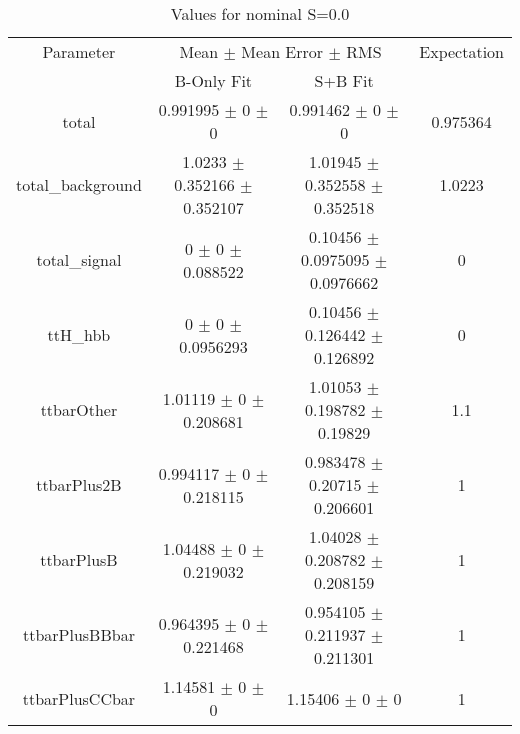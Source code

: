 \begin{table}
\centering
\caption{Values for nominal S=0.0}
\begin{tabular}{cccc}
\toprule
Parameter & \multicolumn{2}{c}{Mean $\pm$ Mean Error $\pm$ RMS} & Expectation\\
 & B-Only Fit & S+B Fit & \\
\midrule
total & \num{0.991995} $\pm$ \num{0} $\pm$ \num{0} & \num{0.991462} $\pm$ \num{0} $\pm$ \num{0} & \num{0.975364}\\
total\_background & \num{1.0233} $\pm$ \num{0.352166} $\pm$ \num{0.352107} & \num{1.01945} $\pm$ \num{0.352558} $\pm$ \num{0.352518} & \num{1.0223}\\
total\_signal & \num{0} $\pm$ \num{0} $\pm$ \num{0.088522} & \num{0.10456} $\pm$ \num{0.0975095} $\pm$ \num{0.0976662} & \num{0}\\
ttH\_hbb & \num{0} $\pm$ \num{0} $\pm$ \num{0.0956293} & \num{0.10456} $\pm$ \num{0.126442} $\pm$ \num{0.126892} & \num{0}\\
ttbarOther & \num{1.01119} $\pm$ \num{0} $\pm$ \num{0.208681} & \num{1.01053} $\pm$ \num{0.198782} $\pm$ \num{0.19829} & \num{1.1}\\
ttbarPlus2B & \num{0.994117} $\pm$ \num{0} $\pm$ \num{0.218115} & \num{0.983478} $\pm$ \num{0.20715} $\pm$ \num{0.206601} & \num{1}\\
ttbarPlusB & \num{1.04488} $\pm$ \num{0} $\pm$ \num{0.219032} & \num{1.04028} $\pm$ \num{0.208782} $\pm$ \num{0.208159} & \num{1}\\
ttbarPlusBBbar & \num{0.964395} $\pm$ \num{0} $\pm$ \num{0.221468} & \num{0.954105} $\pm$ \num{0.211937} $\pm$ \num{0.211301} & \num{1}\\
ttbarPlusCCbar & \num{1.14581} $\pm$ \num{0} $\pm$ \num{0} & \num{1.15406} $\pm$ \num{0} $\pm$ \num{0} & \num{1}\\
\bottomrule
\end{tabular}
\end{table}